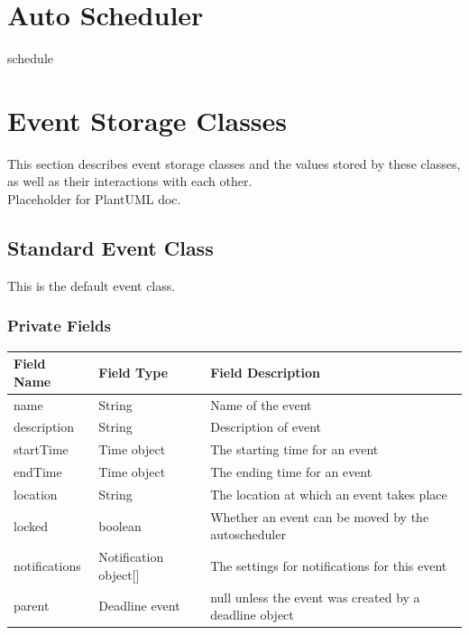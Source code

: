 \documentclass{scrreprt}
\begin{document}
\chapter{Auto Scheduler}

schedule

\chapter{Event Storage Classes}

This section describes event storage classes and the values stored by these classes, as well as their interactions with each other.\\

Placeholder for PlantUML doc.

\section{Standard Event Class}

This is the default event class.

\subsection{Private Fields}

\begin{center}
\begin{longtable}{ | p{3cm} | p{6cm} | p{6cm} | }
\hline
\textbf{Field Name} & \textbf{Field Type} & \textbf{Field Description} \\
\hline
name & String & Name of the event \\
\hline
description & String & Description of event \\
\hline
startTime & Time object & The starting time for an event \\
\hline
endTime & Time object & The ending time for an event \\
\hline
location & String & The location at which an event takes place \\
\hline
locked & boolean & Whether an event can be moved by the autoscheduler \\
\hline
notifications & Notification object[] & The settings for notifications for this event \\
\hline
parent & Deadline event & null unless the event was created by a deadline object \\
\hline
\end{longtable}
\end{center}
\end{document}
